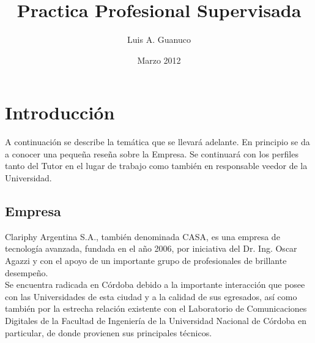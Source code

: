 \message{ !name(temp.tex)}\documentclass[spanish,a4paper]{article}
\author{Luis A. Guanuco}
\title{Practica Profesional Supervisada}
\date{Marzo 2012}
\begin{document}

\maketitle

\section{Introducción}
\label{sec:Planteo de la PPS}
A continuación se describe la temática que se llevará adelante. En
principio se da a conocer una pequeña reseña sobre la Empresa. Se continuará con los perfiles tanto del Tutor en el lugar de trabajo como también en responsable veedor de la Universidad.

\subsection{Empresa}
\label{sec:CASA}

Clariphy Argentina S.A., también denominada CASA, es una empresa de
tecnología avanzada, fundada en el año 2006, por iniciativa del
Dr. Ing. Oscar Agazzi y con el apoyo de un importante grupo de
profesionales de brillante desempeño.\\
Se encuentra radicada en Córdoba debido a la importante interacción
que posee con las Universidades de esta ciudad y a la calidad de sus
egresados, así como también por la estrecha relación existente con el
Laboratorio de Comunicaciones Digitales de la Facultad de Ingeniería
de la Universidad Nacional de Córdoba en particular, de donde
provienen sus principales técnicos.
\end{document}
